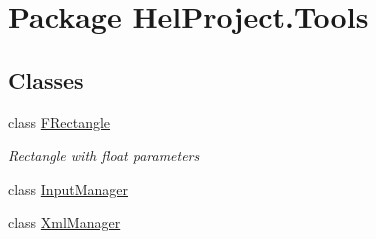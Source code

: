 \hypertarget{namespace_hel_project_1_1_tools}{}\section{Package Hel\+Project.\+Tools}
\label{namespace_hel_project_1_1_tools}
\subsection*{Classes}
\begin{DoxyCompactItemize}
\item 
class \hyperlink{class_hel_project_1_1_tools_1_1_f_rectangle}{F\+Rectangle}
\begin{DoxyCompactList}\small\item\em Rectangle with float parameters \end{DoxyCompactList}\item 
class \hyperlink{class_hel_project_1_1_tools_1_1_input_manager}{Input\+Manager}
\item 
class \hyperlink{class_hel_project_1_1_tools_1_1_xml_manager}{Xml\+Manager}
\end{DoxyCompactItemize}
